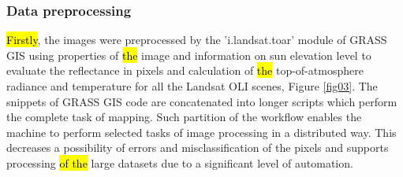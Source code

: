\documentclass[land,article,submit,pdftex,moreauthors]{Definitions/mdpi}
\begin{document}
\subsubsection{Data preprocessing}
\hl{Firstly}, the images were preprocessed by the 'i.landsat.toar' module of GRASS GIS using properties of \hl{the }image and information on sun elevation level to evaluate the reflectance in pixels and calculation of \hl{the }top-of-atmosphere radiance and temperature for all the Landsat OLI scenes, Figure \ref{fig03}. The snippets of GRASS GIS code are concatenated into longer scripts which perform the complete task of mapping. Such\hl{ }partition of the workflow enables the machine to perform selected tasks of image processing in a distributed way. This decreases a possibility of errors and misclassification of the pixels and supports processing \hl{of the }large datasets due to a significant level of automation. 
\end{document}
